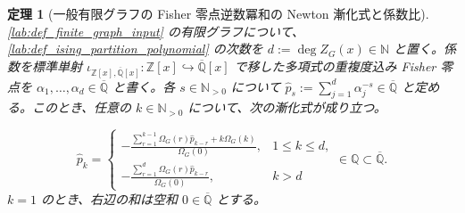 \documentclass[11pt,a4paper]{article}
\newtheorem{theorem}[definition]{定理}
\theoremstyle{remark}
\begin{document}
\begin{theorem}[一般有限グラフの Fisher 零点逆数冪和の Newton 漸化式と係数比]\label{lab:theorem_reciprocal_fisher_zero_power_sum_newton_recurrence}
\cref{lab:def_finite_graph_input}
 の有限グラフについて、
\cref{lab:def_ising_partition_polynomial}
 の次数を 
$d:=\deg Z_G(x)\in\mathbb N$
 と置く。係数を標準単射 
$\iota_{\mathbb Z[x],\overline{\mathbb Q}[x]}:\mathbb Z[x]\hookrightarrow\overline{\mathbb Q}[x]$
 で移した多項式の重複度込み Fisher 零点を 
$\alpha_1,\ldots,\alpha_d\in\overline{\mathbb Q}$
 と書く。各 
$s\in\mathbb N_{>0}$
 について 
$\widehat p_s:=\sum_{j=1}^{d}\alpha_j^{-s}\in\overline{\mathbb Q}$
 と定める。このとき、任意の 
$k\in\mathbb N_{>0}$
 について、次の漸化式が成り立つ。

\[\widehat p_k
=
\begin{cases}
-\frac{
  \displaystyle
  \sum_{r=1}^{k-1}\Omega_G(r)\widehat p_{k-r}
  +k\Omega_G(k)
}{
  \Omega_G(0)
},
&1\le k\le d,\\[8pt]
-\frac{
  \displaystyle
  \sum_{r=1}^{d}\Omega_G(r)\widehat p_{k-r}
}{
  \Omega_G(0)
},
&k>d
\end{cases}
\in\mathbb Q
\subset\overline{\mathbb Q}.\]
$k=1$
 のとき、右辺の和は空和 
$0\in\overline{\mathbb Q}$
 とする。

\end{theorem}
\end{document}
